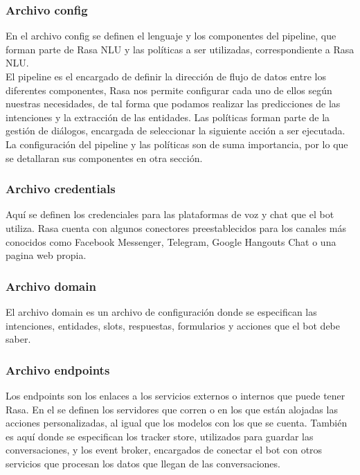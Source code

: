 \subsubsection{Archivo config}
En el archivo config se definen el lenguaje y los componentes del pipeline, que forman parte de Rasa NLU y las políticas a ser utilizadas, correspondiente a Rasa NLU.\\
El pipeline es el encargado de definir la dirección de flujo de datos entre los diferentes componentes, Rasa nos permite configurar cada uno de ellos según nuestras necesidades, de tal forma que podamos realizar las predicciones de las intenciones y la extracción de las entidades. Las políticas forman parte de la gestión de diálogos, encargada de seleccionar la siguiente acción a ser ejecutada. \cite{Configuration_Documentation}
La configuración del pipeline y las políticas son de suma importancia, por lo que se detallaran sus componentes en otra sección.
\subsubsection{Archivo credentials}
Aquí se definen los credenciales para las plataformas de voz y chat que el bot utiliza. Rasa cuenta con algunos conectores preestablecidos para los canales más conocidos como Facebook Messenger, Telegram, Google Hangouts Chat o una pagina web propia. \cite{Credentials_Documentation}
\subsubsection{Archivo domain}
El archivo domain es un archivo de configuración donde se especifican las intenciones, entidades, slots, respuestas, formularios y acciones que el bot debe saber. \cite{Domain_Documentation}
\subsubsection{Archivo endpoints}
Los endpoints son los enlaces a los servicios externos o internos que puede tener Rasa. En el se definen los servidores que corren o en los que están alojadas las acciones personalizadas, al igual que los modelos con los que se cuenta. También es aquí donde se especifican los tracker store, utilizados para guardar las conversaciones, y los event broker, encargados de conectar el bot con otros servicios que procesan los datos que llegan de las conversaciones.
